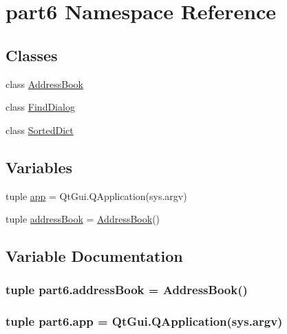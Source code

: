 \hypertarget{namespacepart6}{}\section{part6 Namespace Reference}
\label{namespacepart6}
\subsection*{Classes}
\begin{DoxyCompactItemize}
\item 
class \hyperlink{classpart6_1_1AddressBook}{Address\+Book}
\item 
class \hyperlink{classpart6_1_1FindDialog}{Find\+Dialog}
\item 
class \hyperlink{classpart6_1_1SortedDict}{Sorted\+Dict}
\end{DoxyCompactItemize}
\subsection*{Variables}
\begin{DoxyCompactItemize}
\item 
tuple \hyperlink{namespacepart6_a9b16feeeb27403a0c988b9e0a42c9bd1}{app} = Qt\+Gui.\+Q\+Application(sys.\+argv)
\item 
tuple \hyperlink{namespacepart6_a1240219d3d23cfa8ff200a082ec9a203}{address\+Book} = \hyperlink{classpart6_1_1AddressBook}{Address\+Book}()
\end{DoxyCompactItemize}


\subsection{Variable Documentation}
\hypertarget{namespacepart6_a1240219d3d23cfa8ff200a082ec9a203}{}
\subsubsection[{address\+Book}]{\setlength{\rightskip}{0pt plus 5cm}tuple part6.\+address\+Book = {\bf Address\+Book}()}\label{namespacepart6_a1240219d3d23cfa8ff200a082ec9a203}
\hypertarget{namespacepart6_a9b16feeeb27403a0c988b9e0a42c9bd1}{}
\subsubsection[{app}]{\setlength{\rightskip}{0pt plus 5cm}tuple part6.\+app = Qt\+Gui.\+Q\+Application(sys.\+argv)}\label{namespacepart6_a9b16feeeb27403a0c988b9e0a42c9bd1}

